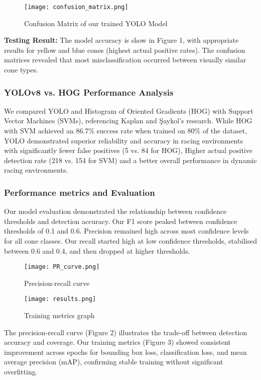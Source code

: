\documentclass[conference]{IEEEtran}
\begin{document}
\begin{figure}[htbp]
\centerline{\texttt{[image: confusion\_matrix.png]}}
\caption{Confusion Matrix of our trained YOLO Model}
\label{fig}
\end{figure}

\textbf{Testing Result:} The model accuracy is show in Figure 1, with appropriate results for yellow and blue cones (highest actual positive rates). The confusion matrices revealed that most misclassification occurred between visually similar cone types.

\subsubsection{YOLOv8 vs. HOG Performance Analysis}
We compared YOLO and Histogram of Oriented Gradients (HOG) with Support Vector Machines (SVMs), referencing Kaplan and Şaykol's research. While HOG with SVM achieved an 86.7\% success rate when trained on 80\% of the dataset, YOLO demonstrated superior reliability and accuracy in racing environments with significantly fewer false positives (5 vs. 84 for HOG), Higher actual positive detection rate (218 vs. 154 for SVM) and a better overall performance in dynamic racing environments.

\subsubsection{Performance metrics and Evaluation}
Our model evaluation demonstrated the relationship between confidence thresholds and detection accuracy. Our F1 score peaked between confidence thresholds of 0.1 and 0.6. Precision remained high across most confidence levels for all cone classes. Our recall started high at low confidence thresholds, stabilised between 0.6 and 0.4, and then dropped at higher thresholds.

\begin{figure}[htbp]
\centerline{\texttt{[image: PR\_curve.png]}}
\caption{Precision-recall curve}
\label{fig}
\end{figure}

\begin{figure}[htbp]
\centerline{\texttt{[image: results.png]}}
\caption{Training metrics graph}
\label{fig}
\end{figure}

The precision-recall curve (Figure 2) illustrates the trade-off between detection accuracy and coverage. Our training metrics (Figure 3) showed consistent improvement across epochs for bounding box loss, classification loss, and mean average precision (mAP), confirming stable training without significant overfitting.
\end{document}
